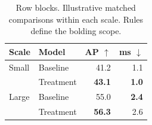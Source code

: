 \begin{table}[!htbp]
\centering\small
\begin{tabular}{llrr}
\toprule
Scale & Model & AP $\uparrow$ & ms $\downarrow$ \\
\midrule
Small & Baseline & 41.2 & 1.1 \\
& Treatment & \textbf{43.1} & \textbf{1.0} \\
\midrule
Large & Baseline & 55.0 & \textbf{2.4} \\
& Treatment & \textbf{56.3} & 2.6 \\
\bottomrule
\end{tabular}
\caption{Row blocks. Illustrative matched comparisons within each scale. Rules define the bolding scope.}
\label{tab:row-blocks}
\end{table}
